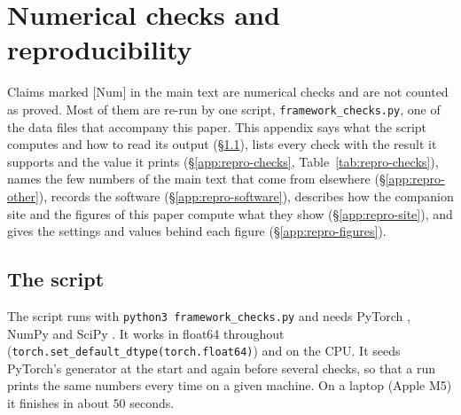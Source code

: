 \section{Numerical checks and reproducibility}\label{app:repro}

Claims marked [Num] in the main text are numerical checks and are not counted as proved. Most of them are re-run by one
script, \texttt{framework\_checks.py}, one of the data files that accompany this paper. This appendix says what the script
computes and how to read its output (\S\ref{app:repro-script}), lists every check with the result it supports and the
value it prints (\S\ref{app:repro-checks}, Table~\ref{tab:repro-checks}), names the few numbers of the main text that
come from elsewhere (\S\ref{app:repro-other}), records the software (\S\ref{app:repro-software}), describes how
the companion site and the figures of this paper compute what they show (\S\ref{app:repro-site}), and gives the
settings and values behind each figure (\S\ref{app:repro-figures}).

\subsection{The script}\label{app:repro-script}

The script runs with \texttt{python3 framework\_checks.py} and needs PyTorch \citep{xpaszke2019pytorch}, NumPy
\citep{xharris2020array} and SciPy \citep{xvirtanen2020scipy}. It works in float64 throughout
(\texttt{torch.set\_default\_dtype(torch.float64)}) and on the CPU. It seeds PyTorch's generator at the start and again
before several checks, so that a run prints the same numbers every time on a given machine. On a laptop (Apple M5) it
finishes in about $50$ seconds.

